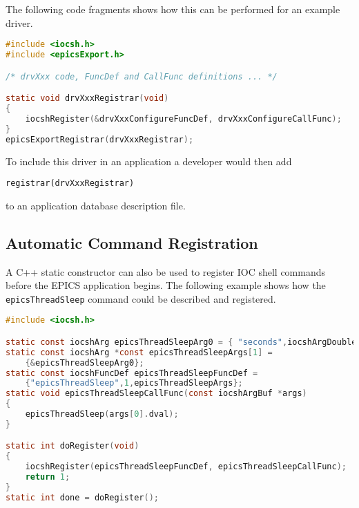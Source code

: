 The following code fragments shows how this can be performed for an example driver.

\begin{lstlisting}[language=C]
#include <iocsh.h>
#include <epicsExport.h>

/* drvXxx code, FuncDef and CallFunc definitions ... */

static void drvXxxRegistrar(void)
{
    iocshRegister(&drvXxxConfigureFuncDef, drvXxxConfigureCallFunc);
}
epicsExportRegistrar(drvXxxRegistrar);
\end{lstlisting}

To include this driver in an application a developer would then add

\begin{verbatim}
registrar(drvXxxRegistrar)
\end{verbatim}

to an application database description file.

\subsection{Automatic Command Registration}

A C++ static constructor can also be used to register IOC shell commands before the EPICS application begins.
The following example shows how the \verb|epicsThreadSleep| command could be described and registered.

\begin{lstlisting}[language=C]
#include <iocsh.h>

static const iocshArg epicsThreadSleepArg0 = { "seconds",iocshArgDouble};
static const iocshArg *const epicsThreadSleepArgs[1] =
    {&epicsThreadSleepArg0};
static const iocshFuncDef epicsThreadSleepFuncDef =
    {"epicsThreadSleep",1,epicsThreadSleepArgs};
static void epicsThreadSleepCallFunc(const iocshArgBuf *args)
{
    epicsThreadSleep(args[0].dval);
}

static int doRegister(void)
{
    iocshRegister(epicsThreadSleepFuncDef, epicsThreadSleepCallFunc);
    return 1;
}
static int done = doRegister();
\end{lstlisting}

